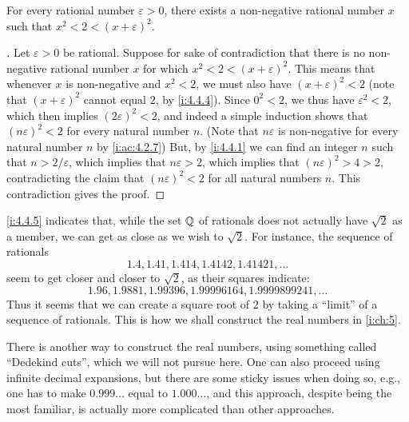 \begin{prop}\label{i:4.4.5}
  For every rational number \(\varepsilon > 0\), there exists a non-negative rational number \(x\) such that \(x^2 < 2 < (x + \varepsilon)^2\).
\end{prop}

\begin{proof}[]
  Let \(\varepsilon > 0\) be rational.
  Suppose for sake of contradiction that there is no non-negative rational number \(x\) for which \(x^2 < 2 < (x + \varepsilon)^2\).
  This means that whenever \(x\) is non-negative and \(x^2 < 2\), we must also have \((x + \varepsilon)^2 < 2\)
  (note that \((x + \varepsilon)^2\) cannot equal \(2\), by \cref{i:4.4.4}).
  Since \(0^2 < 2\), we thus have \(\varepsilon^2 < 2\), which then implies \((2\varepsilon)^2 < 2\), and indeed a simple induction shows that \((n\varepsilon)^2 < 2\) for every natural number \(n\).
  (Note that \(n\varepsilon\) is non-negative for every natural number \(n\) by \cref{i:ac:4.2.7})
  But, by \cref{i:4.4.1} we can find an integer \(n\) such that \(n > 2 / \varepsilon\), which implies that \(n\varepsilon > 2\), which implies that \((n\varepsilon)^2 > 4 > 2\), contradicting the claim that \((n\varepsilon)^2 < 2\) for all natural numbers \(n\).
  This contradiction gives the proof.
\end{proof}

\begin{note}
  \cref{i:4.4.5} indicates that, while the set \(\mathbb{Q}\) of rationals does not actually have \(\sqrt{2}\) as a member, we can get as close as we wish to \(\sqrt{2}\).
  For instance, the sequence of rationals
  \[
    1.4, 1.41, 1.414, 1.4142, 1.41421, \dots
  \]
  seem to get closer and closer to \(\sqrt{2}\), as their squares indicate:
  \[
    1.96, 1.9881, 1.99396, 1.99996164, 1.9999899241, \dots
  \]
  Thus it seems that we can create a square root of \(2\) by taking a ``limit'' of a sequence of rationals.
  This is how we shall construct the real numbers in \cref{i:ch:5}.
\end{note}

\begin{note}
  There is another way to construct the real numbers, using something called ``Dedekind cuts'', which we will not pursue here.
  One can also proceed using infinite decimal expansions, but there are some sticky issues when doing so, e.g., one has to make \(0.999\dots\) equal to \(1.000\dots\), and this approach, despite being the most familiar, is actually more complicated than other approaches.
\end{note}

